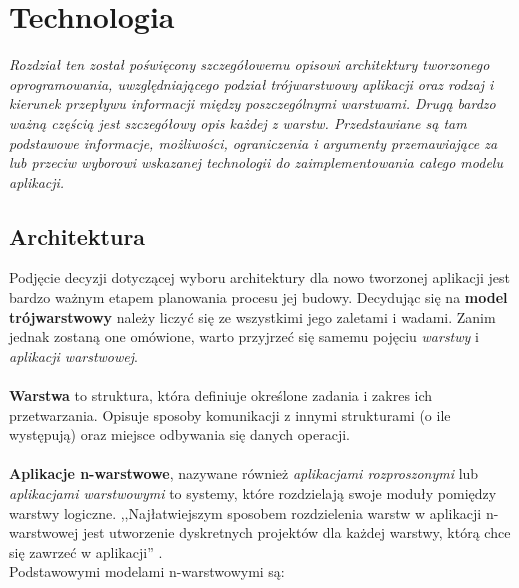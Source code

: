 \chapter{Technologia}
{\em \quad Rozdział ten został poświęcony szczegółowemu opisowi architektury tworzonego oprogramowania, uwzględniającego podział trójwarstwowy aplikacji oraz rodzaj i kierunek przepływu informacji między poszczególnymi warstwami. Drugą bardzo ważną częścią jest szczegółowy opis każdej z warstw. Przedstawiane są tam podstawowe informacje, możliwości, ograniczenia i argumenty przemawiające za lub przeciw wyborowi wskazanej technologii do zaimplementowania całego modelu aplikacji.}

\section{Architektura}
\quad Podjęcie decyzji dotyczącej wyboru architektury dla nowo tworzonej aplikacji jest bardzo ważnym etapem planowania procesu jej budowy. 
Decydując się na \textbf{model trójwarstwowy} należy liczyć się ze wszystkimi jego zaletami i wadami. Zanim jednak zostaną one omówione, warto przyjrzeć się samemu pojęciu \textit{warstwy} i \textit{aplikacji warstwowej}.\\
\\
\textbf{Warstwa} to struktura, która definiuje określone zadania i zakres ich przetwarzania. Opisuje sposoby komunikacji z innymi strukturami (o ile występują) oraz miejsce odbywania się danych operacji.\\
\\
\textbf{Aplikacje n-warstwowe}, nazywane również \textit{aplikacjami rozproszonymi} lub \textit{aplikacjami warstwowymi} to systemy, które rozdzielają swoje moduły pomiędzy warstwy logiczne. ,,Najłatwiejszym sposobem rozdzielenia warstw w aplikacji n-warstwowej jest utworzenie dyskretnych projektów dla każdej warstwy, którą chce się zawrzeć w aplikacji'' \cite{tier-applications}.\\
Podstawowymi modelami n-warstwowymi są:
